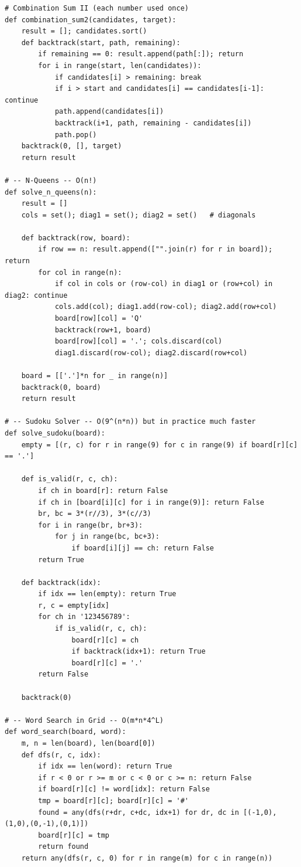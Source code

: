 \documentclass[11pt,a4paper]{report}
\begin{document}
\begin{lstlisting}
# Combination Sum II (each number used once)
def combination_sum2(candidates, target):
    result = []; candidates.sort()
    def backtrack(start, path, remaining):
        if remaining == 0: result.append(path[:]); return
        for i in range(start, len(candidates)):
            if candidates[i] > remaining: break
            if i > start and candidates[i] == candidates[i-1]: continue
            path.append(candidates[i])
            backtrack(i+1, path, remaining - candidates[i])
            path.pop()
    backtrack(0, [], target)
    return result

# -- N-Queens -- O(n!)
def solve_n_queens(n):
    result = []
    cols = set(); diag1 = set(); diag2 = set()   # diagonals

    def backtrack(row, board):
        if row == n: result.append(["".join(r) for r in board]); return
        for col in range(n):
            if col in cols or (row-col) in diag1 or (row+col) in diag2: continue
            cols.add(col); diag1.add(row-col); diag2.add(row+col)
            board[row][col] = 'Q'
            backtrack(row+1, board)
            board[row][col] = '.'; cols.discard(col)
            diag1.discard(row-col); diag2.discard(row+col)

    board = [['.']*n for _ in range(n)]
    backtrack(0, board)
    return result

# -- Sudoku Solver -- O(9^(n*n)) but in practice much faster
def solve_sudoku(board):
    empty = [(r, c) for r in range(9) for c in range(9) if board[r][c] == '.']

    def is_valid(r, c, ch):
        if ch in board[r]: return False
        if ch in [board[i][c] for i in range(9)]: return False
        br, bc = 3*(r//3), 3*(c//3)
        for i in range(br, br+3):
            for j in range(bc, bc+3):
                if board[i][j] == ch: return False
        return True

    def backtrack(idx):
        if idx == len(empty): return True
        r, c = empty[idx]
        for ch in '123456789':
            if is_valid(r, c, ch):
                board[r][c] = ch
                if backtrack(idx+1): return True
                board[r][c] = '.'
        return False

    backtrack(0)

# -- Word Search in Grid -- O(m*n*4^L)
def word_search(board, word):
    m, n = len(board), len(board[0])
    def dfs(r, c, idx):
        if idx == len(word): return True
        if r < 0 or r >= m or c < 0 or c >= n: return False
        if board[r][c] != word[idx]: return False
        tmp = board[r][c]; board[r][c] = '#'
        found = any(dfs(r+dr, c+dc, idx+1) for dr, dc in [(-1,0),(1,0),(0,-1),(0,1)])
        board[r][c] = tmp
        return found
    return any(dfs(r, c, 0) for r in range(m) for c in range(n))


\end{lstlisting}
\end{document}
